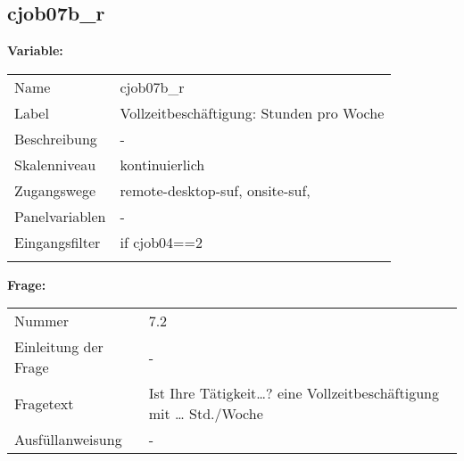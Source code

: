 	
	
	\subsection{cjob07b\_r}
	\label{subSection:cjob07b_r}

	\noindent\textbf{Variable:}\\
		\begin{tabular}{lL{11.3cm}}
			\label{tableVariable:cjob07b_r}
			Name & cjob07b\_r \\
			Label & Vollzeitbeschäftigung: Stunden pro Woche \\
			Beschreibung & - \\
			Skalenniveau & kontinuierlich \\
			Zugangswege &
				remote-desktop-suf,
				onsite-suf,
 \\
			Panelvariablen & -
			 \\
			Eingangsfilter & if cjob04==2 \\
 \\
		\end{tabular}

		\vspace*{1 cm}
		\noindent\textbf{Frage:}\\
		\begin{tabular}{lL{11.3cm}}
			\label{tableQuestion:cjob07b_r}
			Nummer & 7.2 \\
			Einleitung der Frage & - \\
			Fragetext & Ist Ihre Tätigkeit…?
eine Vollzeitbeschäftigung mit … Std./Woche \\
			Ausfüllanweisung & - \\
		\end{tabular}




